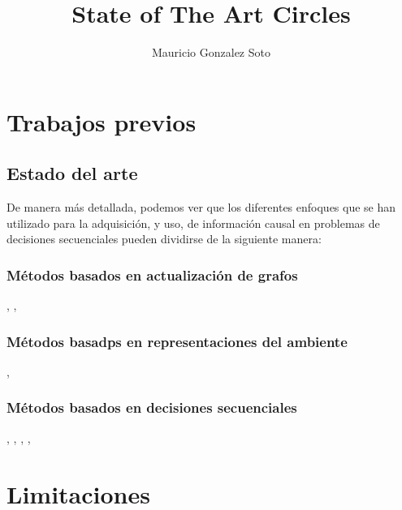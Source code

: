 \documentclass[11pt]{article}
\title{State of The Art Circles}
\author{Mauricio Gonzalez Soto}
\theoremstyle{plain}
\begin{document}
\maketitle
\section{Trabajos previos}
\subsection{Estado del arte}
De manera más detallada, podemos ver que los diferentes enfoques que se han utilizado para la adquisición, y uso, de información causal en problemas de decisiones secuenciales pueden dividirse de la siguiente manera:
\subsubsection{Métodos basados en actualización de grafos}
\cite{heckerman2006bayesian}, \cite{wellen2012learning}, \cite{kummerfeld2013tracking}
\subsubsection{Métodos basadps en representaciones del ambiente}
\cite{ho2013knowledge}, \cite{ho2014rapid} \cite{garnelo2016towards}
\subsubsection{Métodos basados en decisiones secuenciales}
\cite{hagmayer2008causal}, \cite{hagmayer2013repeated}, \cite{alon2015online}, \cite{albrecht2016exploiting} \cite{lattimoreNIPS2016}, \cite{innes2018reasoning}
\section{Limitaciones}
\end{document}
